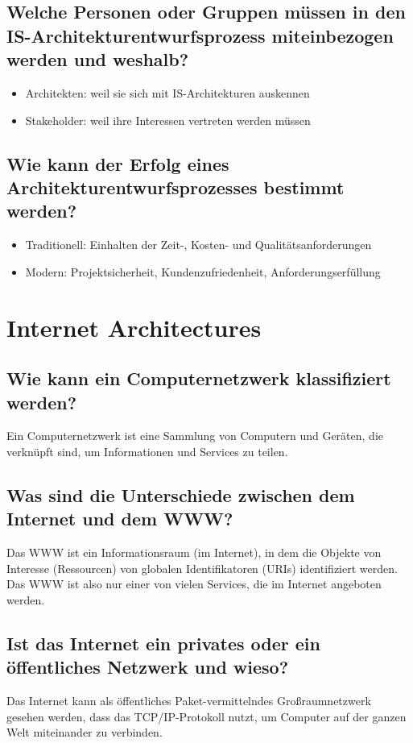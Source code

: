 \documentclass{article}
\begin{document}
\subsection{Welche Personen oder Gruppen müssen in den IS-Architekturentwurfsprozess miteinbezogen werden und weshalb?}
\begin{itemize}
    \item Architekten: weil sie sich mit IS-Architekturen auskennen
    \item Stakeholder: weil ihre Interessen vertreten werden müssen
\end{itemize}
\subsection{Wie kann der Erfolg eines Architekturentwurfsprozesses bestimmt werden?}
\begin{itemize}
    \item Traditionell: Einhalten der Zeit-, Kosten- und Qualitätsanforderungen
    \item Modern: Projektsicherheit, Kundenzufriedenheit, Anforderungserfüllung
\end{itemize}
\section{Internet Architectures}
\subsection{Wie kann ein Computernetzwerk klassifiziert werden?}
Ein Computernetzwerk ist eine Sammlung von Computern und Geräten, die verknüpft sind, um Informationen und Services zu teilen.
\subsection{Was sind die Unterschiede zwischen dem Internet und dem WWW?}
Das WWW ist ein Informationsraum (im Internet), in dem die Objekte von Interesse (Ressourcen) von globalen Identifikatoren (URIs) identifiziert werden. Das WWW ist also nur einer von vielen Services, die im Internet angeboten werden.
\subsection{Ist das Internet ein privates oder ein öffentliches Netzwerk und wieso?}
Das Internet kann als öffentliches Paket-vermittelndes Großraumnetzwerk gesehen werden, dass das TCP/IP-Protokoll nutzt, um Computer auf der ganzen Welt miteinander zu verbinden.
\end{document}
